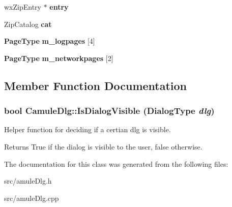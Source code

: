 \begin{DoxyCompactItemize}
\item 
wxZipEntry $\ast$ {\bfseries entry}\label{classCamuleDlg_a86174a10c4233e283962261c794487f9}

\item 
ZipCatalog {\bfseries cat}\label{classCamuleDlg_ab3720de62ceaf22e08797f8bb99a72f8}

\item 
{\bf PageType} {\bfseries m\_\-logpages} [4]\label{classCamuleDlg_a40e0773a6092a888e0d973d0780e2697}

\item 
{\bf PageType} {\bfseries m\_\-networkpages} [2]\label{classCamuleDlg_a8d8c77cd404a38870c6617b064b67b54}

\end{DoxyCompactItemize}


\subsection{Member Function Documentation}
\subsubsection[{IsDialogVisible}]{\setlength{\rightskip}{0pt plus 5cm}bool CamuleDlg::IsDialogVisible (DialogType {\em dlg})\hspace{0.3cm}{\ttfamily  [inline]}}\label{classCamuleDlg_a99bc13bc854fd1b4c1faa4e1cfcce2c5}


Helper function for deciding if a certian dlg is visible. \begin{DoxyReturn}{Returns}
True if the dialog is visible to the user, false otherwise. 
\end{DoxyReturn}


The documentation for this class was generated from the following files:\begin{DoxyCompactItemize}
\item 
src/amuleDlg.h\item 
src/amuleDlg.cpp\end{DoxyCompactItemize}
